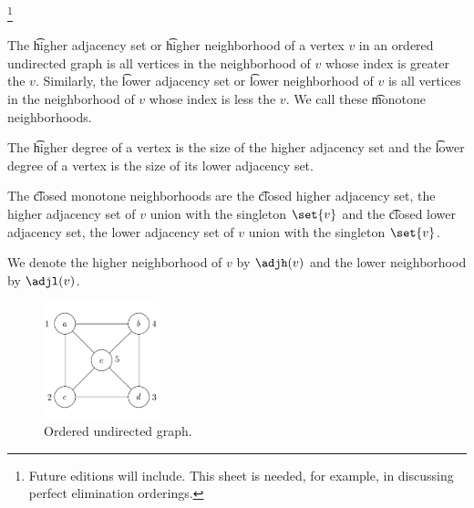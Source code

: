 
\footnote{Future editions will include. This sheet is needed, for example, in discussing perfect elimination orderings.}


The \t{higher adjacency set} or \t{higher neighborhood} of a vertex $v$ in an ordered undirected graph is all vertices in the neighborhood of $v$ whose index is greater the $v$.
Similarly, the \t{lower adjacency set} or \t{lower neighborhood} of $v$ is all vertices in the neighborhood of $v$ whose index is less the $v$.
We call these \t{monotone neighborhoods}.

The \t{higher degree} of a vertex is the size of the higher adjacency set and the \t{lower degree} of a vertex is the size of its lower adjacency set.

The \t{closed monotone neighborhoods} are the \t{closed higher adjacency set}, the higher adjacency set of $v$ union with the singleton $\set{v}$ and the \t{closed lower adjacency set}, the lower adjacency set of $v$ union with the singleton $\set{v}$.


We denote the higher neighborhood of $v$ by $\adjh(v)$ and the lower neighborhood by $\adjl(v)$.



\begin{figure}
  \centering
  \includegraphics[width=0.3\textwidth]{graphics_included/ordered_undirected_graph}
  \caption{Ordered undirected graph.}
\end{figure}


